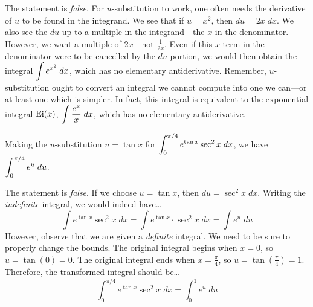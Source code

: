 \documentclass[11pt,letterpaper]{article}
\begin{document}
\sol The statement is \textit{false}. For $u$-substitution to work, one often needs the derivative of $u$ to be found in the integrand. We see that if $u= x^2$, then $du= 2x \;dx$. We also see the $du$ up to a multiple in the integrand---the $x$ in the denominator. However, we want a multiple of $2x$---not $\frac{1}{2x}$. Even if this $x$-term in the denominator were to be cancelled by the $du$ portion, we would then obtain the integral $\displaystyle\int e^{x^2} \;dx$, which has no elementary antiderivative. Remember, $u$-substitution ought to convert an integral we cannot compute into one we can---or at least one which is simpler. In fact, this integral is equivalent to the exponential integral $\displaystyle \mathrm{Ei}(x)$, $\displaystyle\int \dfrac{e^x}{x} \;dx$, which has no elementary antiderivative. \pvspace{1.3cm}



 Making the $u$-substitution $u= \tan x$ for $\displaystyle\int_0^{\pi/4} e^{\tan x} \sec^2 x \;dx$, we have $\displaystyle\int_0^{\pi/4} e^u \;du$. \pspace

\sol The statement is \textit{false}. If we choose $u= \tan x$, then $du= \sec^2 x \;dx$. Writing the \textit{indefinite} integral, we would indeed have\dots
	\[
	\int e^{\tan x} \sec^2 x \;dx= \int e^{\tan x} \cdot \sec^2 x \;dx= \int e^u \;du
	\]
However, observe that we are given a \textit{definite} integral. We need to be sure to properly change the bounds. The original integral begins when $x= 0$, so $u= \tan(0)= 0$. The original integral ends when $x= \frac{\pi}{4}$, so $u= \tan(\tfrac{\pi}{4})= 1$. Therefore, the transformed integral should be\dots
	\[
	\int_0^{\pi/4} e^{\tan x} \sec^2 x \;dx= \int_0^1 e^u \;du
	\]
\end{document}
